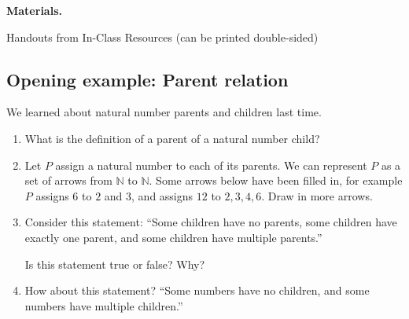 \documentclass[11pt]{article}
\newenvironment{bignote}[1][Instructor note]%
	{\begin{mdframed}\raggedright{\bf #1.~}}
	{\end{mdframed}}
\newenvironment{task}
	{\begin{mdframed}[linecolor=lightgray, linewidth=3pt]\raggedright}
	{\end{mdframed}}
\newcommand{\N}{\mathbb{N}}
\theoremstyle{definition}
\begin{document}
\newpage
\begin{bignote}[Materials]
\begin{itemize*}
\item Handouts from In-Class Resources (can be printed double-sided)
\end{itemize*}
\end{bignote}
\subsection{Opening example: Parent relation}

\begin{task}
We learned about natural number parents and children last time.

\begin{enumerate}
\item What is the definition of a parent of a natural number child? 
\item 
Let $P$ assign a natural number to each of its parents. We can represent $P$ as a set of arrows from $\N$ to $\N$.  Some arrows below have been filled in, for example $P$ assigns $6$ to $2$ and $3$, and assigns $12$ to $2, 3, 4, 6$.  Draw in more arrows.

\item Consider this statement: ``Some children have no parents, some children have exactly one parent, and some children have multiple parents.''  

Is this statement true or false? Why?

\item How about this statement? ``Some numbers have no children, and some numbers have multiple children.'' 
\end{enumerate}

\vfill
\begin{center}
\end{center}
\end{task}
\end{document}
